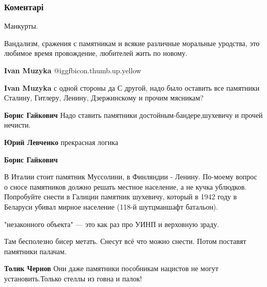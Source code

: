  
 
 
 
 
\subsubsection{Коментарі}

\begin{itemize} %
Манкурты.

Вандализм, сражения с памятникам и всякие различные моральные уродства, это
любимое время провождение, любителей жить по новому.

\begin{itemize} %
\textbf{Ivan Muzyka}  @igg{fbicon.thumb.up.yellow} 

\textbf{Ivan Muzyka} с одной стороны да
С другой, надо было оставить все памятники Сталину, Гитлеру, Ленину, Дзержинскому и прочим мясникам?

\textbf{Борис Гайкович} Надо ставить памятники достойным-бандере,шухевичу и прочей нечисти.

\textbf{Юрий Левченко} прекрасная логика

\textbf{Борис Гайкович} 

В Италии стоит памятник Муссолини, в Финляндии - Ленину. По-моему вопрос о сносе
памятников должно решать местное население, а не кучка ублюдков. Попробуйте
снести в Галиции памятник шухевичу, который в 1942 году в Беларуси убивал мирное
население (118-й шутцманшафт батальон).

\end{itemize} %

"незаконного объекта" — это как раз про УИНП и верховную зраду.

Там бесполезно бисер метать. Снесут всё что можно снести. Потом поставят памятники палачам.

\begin{itemize} %
\textbf{Толик Чернов} Они даже памятники пособникам нацистов не могут установить.Только стеллы из говна и палок!
\end{itemize} %


\end{itemize}
